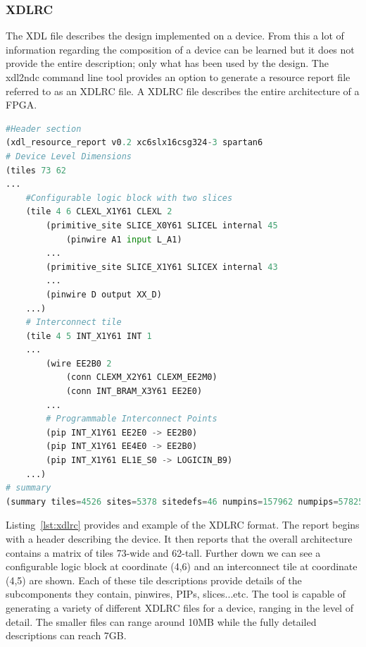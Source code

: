 \subsubsection{XDLRC} \label{sec:XDLRC}
The \acrshort{XDL} file describes the design implemented on a device.
From this a lot of information regarding the composition of a \Xilinx device can be learned but it does not provide the entire description; only what has been used by the design.
The \acrshort{xdl2ndc} command line tool provides an option to generate a resource report file referred to as an XDLRC file. 
A XDLRC file describes the entire architecture of a \Xilinx \acrshort{FPGA}.
\ConditionSize
\begin{lstlisting}[label={lst:xdlrc}, language=Python, caption={A hierarchical XDLRC resource description of a Spartan 6 FPGA consisting of a header, a tile section, and a trailing device summary~\cite{xdlTutorial}}]
#Header section
(xdl_resource_report v0.2 xc6slx16csg324-3 spartan6
# Device Level Dimensions
(tiles 73 62
...
	#Configurable logic block with two slices
	(tile 4 6 CLEXL_X1Y61 CLEXL 2
		(primitive_site SLICE_X0Y61 SLICEL internal 45
			(pinwire A1 input L_A1)
		...
		(primitive_site SLICE_X1Y61 SLICEX internal 43
		...
		(pinwire D output XX_D)
	...)
	# Interconnect tile
	(tile 4 5 INT_X1Y61 INT 1
	...
		(wire EE2B0 2
			(conn CLEXM_X2Y61 CLEXM_EE2M0)
			(conn INT_BRAM_X3Y61 EE2E0)
		...
		# Programmable Interconnect Points
		(pip INT_X1Y61 EE2E0 -> EE2B0)
		(pip INT_X1Y61 EE4E0 -> EE2B0)
		(pip INT_X1Y61 EL1E_S0 -> LOGICIN_B9)
	...)
# summary
(summary tiles=4526 sites=5378 sitedefs=46 numpins=157962 numpips=5782505))
\end{lstlisting}
\normalsize

Listing~\ref{lst:xdlrc} provides and example of the XDLRC format.
The report begins with a header describing the device.
It then reports that the overall architecture contains a matrix of tiles 73-wide and 62-tall.
Further down we can see a configurable logic block at coordinate (4,6) and an interconnect tile at coordinate (4,5) are shown.
Each of these tile descriptions provide details of the subcomponents they contain, pinwires, \acrshort{PIP}s, slices...etc.
The tool is capable of generating a variety of different XDLRC files for a device, ranging in the level of detail.
The smaller files can range around 10MB while the fully detailed descriptions can reach 7GB.
